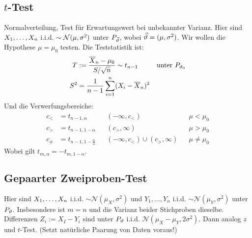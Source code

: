 \subsection*{$t$-Test}
Normalverteilung, Test für Erwartungswert bei unbekannter Varianz. Hier sind
$X_1, \dots, X_n$ i.i.d. $\sim \mathcal{N} (\mu, \sigma^2)$ unter $P_{\vec{\vartheta}}$, wobei
$\vec{\vartheta} = (\mu, \sigma^2)$. Wir wollen die Hypothese $\mu = \mu_0$ testen.
Die Teststatistik ist:
\begin{align*}
  T   & := \frac{\overline{X}_n - \mu_0}{S / \sqrt{n}} \sim t_{n-1}
      &                                                             & \text{unter } P_{\vartheta_0} \\
  S^2 & = \frac{1}{n-1} \sum_{i = 1}^n  (X_i - \overline{X}_n)^2
\end{align*}
Und die Verwerfungsbereiche:
\begin{align*}
  c_<      & = t_{n-1, \alpha}               &  & (-\infty, c_<)                     &  & \mu < \mu_0    \\
  c_>      & = t_{n-1, 1 - \alpha}           &  & (c_>, \infty)                      &  & \mu > \mu_0    \\
  c_{\neq} & = t_{n-1, 1 - \frac{\alpha}{2}} &  & (-\infty, c_<) \cup  (c_>, \infty) &  & \mu \neq \mu_0
\end{align*}
Wobei gilt $t_{m, \alpha} = -t_{m, 1 - \alpha}$.
\subsection*{Gepaarter Zweiproben-Test}
Hier sind $X_1, \dots, X_n$ i.i.d. $\sim \mathcal{N} (\mu_X, \sigma^2)$ und
$Y_1, \dots, Y_n$ i.i.d. $\sim \mathcal{N} (\mu_Y, \sigma^2)$ unter $P_\vartheta$.
Insbesondere ist $m = n$ und die Varianz beider Stichproben dieselbe.
Differenzen $Z_i := X_I - Y_i$ sind unter $P_\vartheta$ i.i.d. $\mathcal{N} (\mu_X -
  \mu_Y, 2 \sigma^2)$. Dann analog $z$ und $t$-Test. (Setzt natürliche Paarung
von Daten voraus!)
